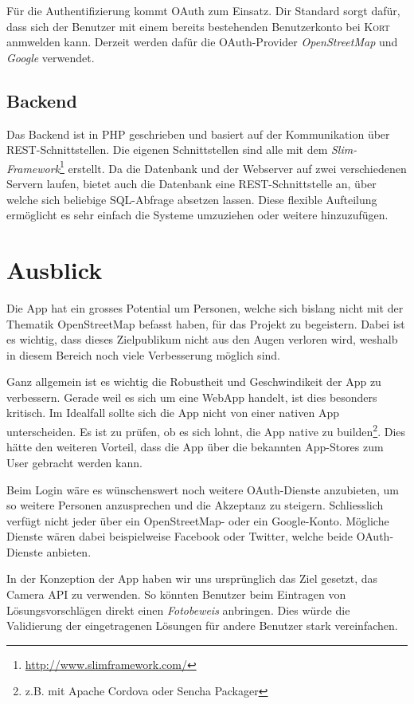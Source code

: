 Für die Authentifizierung kommt \gls{OAuth} zum Einsatz.
Dir Standard sorgt dafür, dass sich der Benutzer mit einem bereits bestehenden Benutzerkonto bei \textsc{Kort} anmwelden kann.
Derzeit werden dafür die OAuth-Provider \emph{\gls{OpenStreetMap}} und \emph{Google} verwendet.

\subsection*{Backend}
Das Backend ist in PHP geschrieben und basiert auf der Kommunikation über \gls{REST}-Schnittstellen.
Die eigenen Schnittstellen sind alle mit dem \emph{Slim-Framework}\footnote{\url{http://www.slimframework.com/}} erstellt.
Da die Datenbank und der Webserver auf zwei verschiedenen Servern laufen, bietet auch die Datenbank eine \gls{REST}-Schnittstelle an, über welche sich beliebige SQL-Abfrage absetzen lassen.
Diese flexible Aufteilung ermöglicht es sehr einfach die Systeme umzuziehen oder weitere hinzuzufügen.

\section*{Ausblick}
Die App hat ein grosses Potential um Personen, welche sich bislang nicht mit der Thematik \gls{OpenStreetMap} befasst haben, für das Projekt zu begeistern. 
Dabei ist es wichtig, dass dieses Zielpublikum nicht aus den Augen verloren wird, weshalb in diesem Bereich noch viele Verbesserung möglich sind.

Ganz allgemein ist es wichtig die Robustheit und Geschwindikeit der App zu verbessern. 
Gerade weil es sich um eine \gls{WebApp} handelt, ist dies besonders kritisch. 
Im Idealfall sollte sich die App nicht von einer nativen App unterscheiden.
Es ist zu prüfen, ob es sich lohnt, die App native zu builden\footnote{z.B. mit Apache Cordova oder Sencha Packager}.
Dies hätte den weiteren Vorteil, dass die App über die bekannten \glspl{App-Store} zum User gebracht werden kann.

Beim Login wäre es wünschenswert noch weitere \gls{OAuth}-Dienste anzubieten, um so weitere Personen anzusprechen und die Akzeptanz zu steigern.
Schliesslich verfügt nicht jeder über ein \gls{OpenStreetMap}- oder ein Google-Konto.
Mögliche Dienste wären dabei beispielweise Facebook oder Twitter, welche beide \gls{OAuth}-Dienste anbieten.

In der Konzeption der App haben wir uns ursprünglich das Ziel gesetzt, das \gls{Camera API} zu verwenden. 
So könnten Benutzer beim Eintragen von Lösungsvorschlägen direkt einen \emph{Fotobeweis} anbringen. 
Dies würde die Validierung der eingetragenen Lösungen für andere Benutzer stark vereinfachen.

